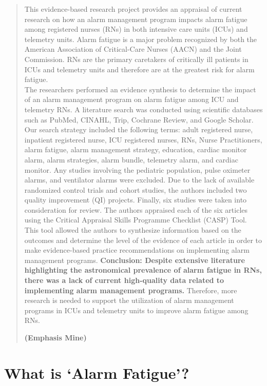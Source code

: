 \begin{quotation}
	This evidence-based research project provides an appraisal of current research on how an alarm management program impacts
	alarm fatigue among registered nurses (RNs) in both intensive care units (ICUs) and telemetry units. Alarm fatigue is a major problem recognized by both the American Association of Critical-Care Nurses (AACN) and the Joint Commission. RNs are the primary caretakers of critically ill patients in ICUs and telemetry units and therefore are at the greatest risk for alarm fatigue. \\
	The researchers performed an evidence synthesis to determine the impact of an alarm management program on alarm fatigue
	among ICU and telemetry RNs. A literature search was conducted using scientiﬁc databases such as PubMed, CINAHL, Trip,
	Cochrane Review, and Google Scholar. Our search strategy included the following terms: adult registered nurse, inpatient registered nurse, ICU registered nurses, RNs, Nurse Practitioners, alarm fatigue, alarm management strategy, education, cardiac monitor
	alarm, alarm strategies, alarm bundle, telemetry alarm, and cardiac monitor. Any studies involving the pediatric population, pulse
	oximeter alarms, and ventilator alarms were excluded. Due to the lack of available randomized control trials and cohort studies,
	the authors included two quality improvement (QI) projects. Finally, six studies were taken into consideration for review. The
	authors appraised each of the six articles using the Critical Appraisal Skills Programme Checklist (CASP) Tool. This tool allowed
	the authors to synthesize information based on the outcomes and determine the level of the evidence of each article in order to
	make evidence-based practice recommendations on implementing alarm management programs. \textbf{Conclusion: Despite extensive
	literature highlighting the astronomical prevalence of alarm fatigue in RNs, there was a lack of current high-quality data related to
	implementing alarm management programs.} Therefore, more research is needed to support the utilization of alarm management
	programs in ICUs and telemetry units to improve alarm fatigue among RNs. \\
	\begin{flushright}
		\textbf{(Emphasis Mine)}
	\end{flushright}
\end{quotation}

\section{What is `Alarm Fatigue'?}

